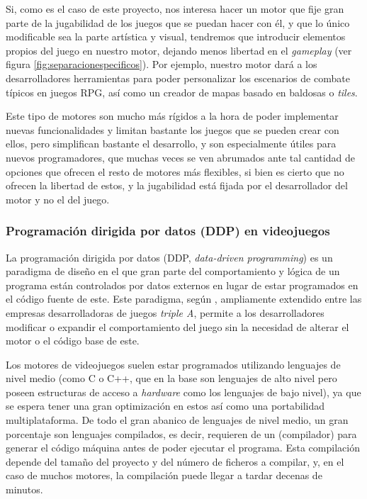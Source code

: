 \medskip

Si, como es el caso de este proyecto, nos interesa hacer un motor que fije gran parte de la jugabilidad de los juegos que se puedan hacer con él, y que lo único modificable sea la parte artística y visual, tendremos que introducir elementos propios del juego en nuestro motor, dejando menos libertad en el \textit{gameplay} (ver figura \ref{fig:separacionespecificos}). Por ejemplo, nuestro motor dará a los desarrolladores herramientas para poder personalizar los escenarios de combate típicos en juegos RPG, así como un creador de mapas basado en baldosas o \textit{tiles}. 

\smallskip

Este tipo de motores son mucho más rígidos a la hora de poder implementar nuevas funcionalidades y limitan bastante los juegos que se pueden crear con ellos, pero simplifican bastante el desarrollo, y son especialmente útiles para nuevos programadores, que muchas veces se ven abrumados ante tal cantidad de opciones que ofrecen el resto de motores más flexibles, si bien es cierto que no ofrecen la libertad de estos, y la jugabilidad está fijada por el desarrollador del motor y no el del juego.

\subsubsection{Programación dirigida por datos (DDP) en videojuegos} \label{section:ddp}
La programación dirigida por datos (DDP, \textit{data-driven programming}) es un paradigma de diseño en el que gran parte del comportamiento y lógica de un programa están controlados por datos externos en lugar de estar programados en el código fuente de este. Este paradigma, según \citeauthor{gregory2018game}, ampliamente extendido entre las empresas desarrolladoras de juegos \textit{triple A}, permite a los desarrolladores modificar o expandir el comportamiento del juego sin la necesidad de alterar el motor o el código base de este.

\medskip

Los motores de videojuegos suelen estar programados utilizando lenguajes de  nivel medio (como C o C++, que en la base son lenguajes de alto nivel pero poseen estructuras de acceso a \textit{hardware} como los lenguajes de bajo nivel), ya que se espera tener una gran optimización en estos así como una portabilidad multiplataforma. De todo el gran abanico de lenguajes de nivel medio, un gran porcentaje son lenguajes compilados, es decir, requieren de un  (compilador) para generar el código máquina antes de poder ejecutar el programa. Esta compilación depende del tamaño del proyecto y del número de ficheros a compilar, y, en el caso de muchos motores, la compilación puede llegar a tardar decenas de minutos.

